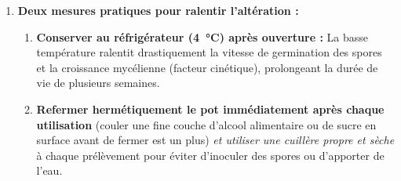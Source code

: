 \documentclass[11pt]{article}
\begin{document}
\begin{corrige}
\begin{enumerate}
\item \textbf{Deux mesures pratiques pour ralentir l'altération :}
\begin{enumerate}
\item \textbf{Conserver au réfrigérateur (\SI{4}{\degreeCelsius}) après ouverture :} La basse température ralentit drastiquement la vitesse de germination des spores et la croissance mycélienne (facteur cinétique), prolongeant la durée de vie de plusieurs semaines.
\item \textbf{Refermer hermétiquement le pot immédiatement après chaque utilisation} (couler une fine couche d'alcool alimentaire ou de sucre en surface avant de fermer est un plus) \emph{et utiliser une cuillère propre et sèche} à chaque prélèvement pour éviter d'inoculer des spores ou d'apporter de l'eau.
\end{enumerate}
\end{enumerate}
\end{corrige}
\end{document}
